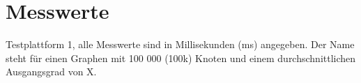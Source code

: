 

\appendix
{}


\section{Messwerte}
\label{Anhang-Messwerte}
Testplattform 1, alle Messwerte sind in Millisekunden (ms) angegeben. Der Name  steht für einen Graphen mit 100 000 (100k) Knoten und einem durchschnittlichen Ausgangsgrad von X.
 


		
